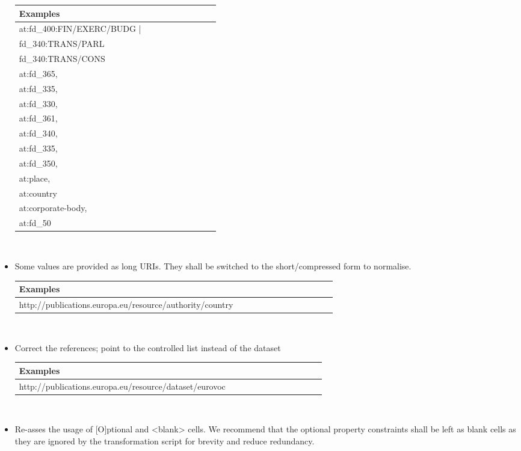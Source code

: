 \begin{itemize}
    \begin{tabular}{|p{0.4\linewidth}|}
        \hline
        \textbf{Examples} \\ \hline
        at:fd\_400:FIN/EXERC/BUDG |      \\ \hline
        fd\_340:TRANS/PARL\\
        fd\_340:TRANS/CONS      \\ \hline
        at:fd\_365,\\
        at:fd\_335,\\
        at:fd\_330,\\
        at:fd\_361,\\
        at:fd\_340,\\
        at:fd\_335,\\
        at:fd\_350,\\
        at:place,\\
        at:country       \\ \hline
        at:corporate-body,\\
        at:fd\_50       \\ \hline
    \end{tabular}
    \\
    \item
    Some values are provided as long URIs. They shall be switched to the short/compressed form to normalise.

    \begin{tabular}{|p{0.7\linewidth}|}
        \hline
        \textbf{Examples} \\ \hline
        http://publications.europa.eu/resource/authority/country     \\ \hline
    \end{tabular}
    \\
    \item
    Correct the references; point to the controlled list instead of the dataset

    \begin{tabular}{|p{0.7\linewidth}|}
        \hline
        \textbf{Examples} \\ \hline
        http://publications.europa.eu/resource/dataset/eurovoc      \\ \hline
    \end{tabular}
    \\
    \item
    Re-asses the usage of [O]ptional and <blank> cells. We recommend that the optional property constraints shall be left as blank cells as they are ignored by the transformation script for brevity and reduce redundancy.


\end{itemize}

